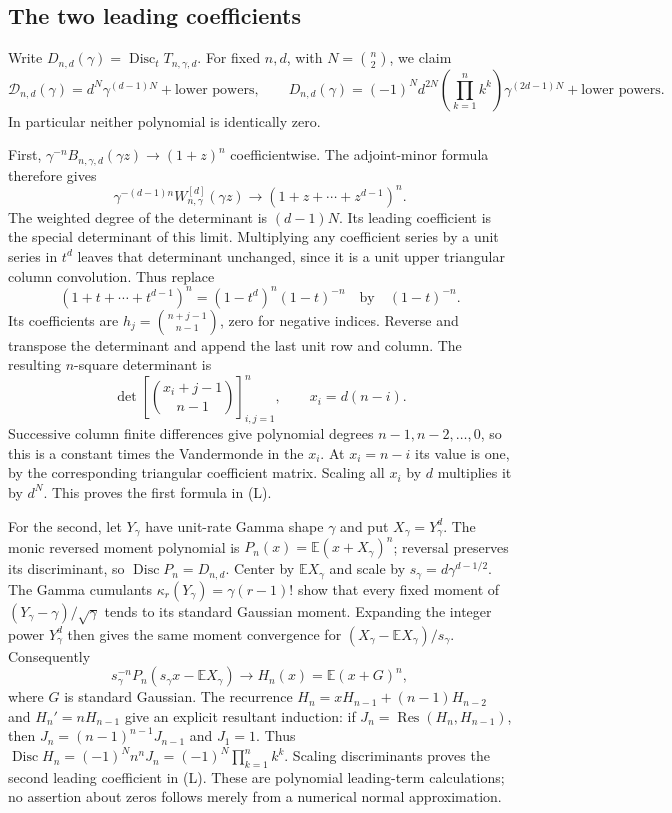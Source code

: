 \documentclass[11pt]{article}
\begin{document}
\subsection*{The two leading coefficients}
Write $D_{n,d}(\gamma)=\operatorname{Disc}_tT_{n,\gamma,d}$.
For fixed $n,d$, with $N=\binom n2$, we claim
\[
 \mathcal D_{n,d}(\gamma)=d^N\gamma^{(d-1)N}
            +\text{lower powers},
\qquad
 D_{n,d}(\gamma)=(-1)^Nd^{2N}
       \left(\prod_{k=1}^n k^k\right)\gamma^{(2d-1)N}
            +\text{lower powers}.                          \tag{L}
\]
In particular neither polynomial is identically zero.

First, $\gamma^{-n}B_{n,\gamma,d}(\gamma z)\to(1+z)^n$
coefficientwise. The adjoint-minor formula therefore gives
\[
 \gamma^{-(d-1)n}W^{[d]}_{n,\gamma}(\gamma z)
       \longrightarrow(1+z+\cdots+z^{d-1})^n.
\]
The weighted degree of the determinant is $(d-1)N$.
Its leading coefficient is the special determinant of this limit.
Multiplying any coefficient series by a unit series in $t^d$ leaves
that determinant unchanged, since it is a unit upper triangular
column convolution. Thus replace
\[
 (1+t+\cdots+t^{d-1})^n=(1-t^d)^n(1-t)^{-n}
 \quad\text{by}\quad(1-t)^{-n}.
\]
Its coefficients are $h_j=\binom{n+j-1}{n-1}$, zero for negative
indices. Reverse and transpose the determinant and append the last
unit row and column. The resulting $n$-square determinant is
\[
 \det\left[\binom{x_i+j-1}{n-1}\right]_{i,j=1}^n,
 \qquad x_i=d(n-i).
\]
Successive column finite differences give polynomial degrees
$n-1,n-2,\ldots,0$, so this is a constant times the Vandermonde
in the $x_i$. At $x_i=n-i$ its value is one, by the corresponding
triangular coefficient matrix. Scaling all $x_i$ by $d$ multiplies
it by $d^N$. This proves the first formula in (L).

For the second, let $Y_\gamma$ have unit-rate Gamma shape $\gamma$
and put $X_\gamma=Y_\gamma^d$. The monic reversed moment polynomial
is $P_n(x)=\mathbb E(x+X_\gamma)^n$; reversal preserves its
discriminant, so $\operatorname{Disc}P_n=D_{n,d}$.
Center by $\mathbb EX_\gamma$ and scale by
$s_\gamma=d\gamma^{d-1/2}$.
The Gamma cumulants
$\kappa_r(Y_\gamma)=\gamma(r-1)!$ show that every fixed moment of
$(Y_\gamma-\gamma)/\sqrt\gamma$ tends to its standard Gaussian
moment. Expanding the integer power $Y_\gamma^d$ then gives the same
moment convergence for
$(X_\gamma-\mathbb EX_\gamma)/s_\gamma$.
Consequently
\[
 s_\gamma^{-n}P_n(s_\gamma x-\mathbb EX_\gamma)
 \longrightarrow H_n(x)=\mathbb E(x+G)^n,
\]
where $G$ is standard Gaussian.
The recurrence $H_n=xH_{n-1}+(n-1)H_{n-2}$ and
$H_n'=nH_{n-1}$ give an explicit resultant induction: if
$J_n=\operatorname{Res}(H_n,H_{n-1})$, then
$J_n=(n-1)^{n-1}J_{n-1}$ and $J_1=1$.
Thus $\operatorname{Disc}H_n=(-1)^Nn^nJ_n
=(-1)^N\prod_{k=1}^nk^k$.
Scaling discriminants proves the second leading coefficient in (L).
These are polynomial leading-term calculations; no assertion about
zeros follows merely from a numerical normal approximation.
\end{document}
